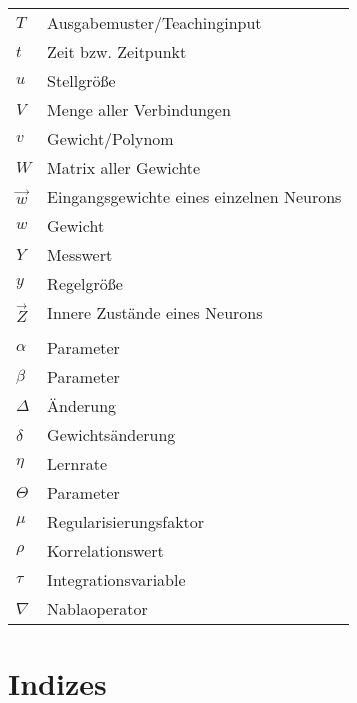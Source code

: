 \begin{longtable}[l]{p{3cm}|p{12cm}}
        $T$ & Ausgabemuster/Teachinginput\\
        $t$ & Zeit bzw. Zeitpunkt\\
        $u$ & Stellgröße\\
        $V$ & Menge aller Verbindungen\\
        $v$ & Gewicht/Polynom\\
        $W$ & Matrix aller Gewichte\\
        $\vec{w}$ & Eingangsgewichte eines einzelnen Neurons\\
        $w$ & Gewicht\\
        $Y$ & Messwert\\
        $y$ & Regelgröße\\
        $\vec{Z}$ & Innere Zustände eines Neurons\\
        &\\
        $\alpha$ & Parameter \\
        $\beta$ & Parameter \\
        $\Delta$ & Änderung \\
        $\delta$ & Gewichtsänderung\\
        $\eta$ & Lernrate\\
        $\Theta$ & Parameter\\
        $\mu$ & Regularisierungsfaktor\\
        $\rho$ & Korrelationswert\\ 
        $\tau$ & Integrationsvariable\\
        $\nabla$ & Nablaoperator \\
       
    \end{longtable}

    \section{Indizes}
    
